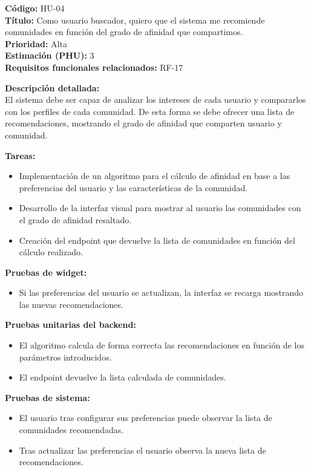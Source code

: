 \begin{tarjetaHU}
\textbf{Código:} HU-04 \\
\textbf{Título:} Como usuario buscador, quiero que el sistema me recomiende comunidades en función del grado de afinidad que compartimos. \\
\textbf{Prioridad:} Alta \\
\textbf{Estimación (PHU):} 3 \\
\textbf{Requisitos funcionales relacionados:} RF-17

\vspace{0.5em}
\textbf{Descripción detallada:} \\
El sistema debe ser capaz de analizar los intereses de cada usuario y compararlos con los perfiles de cada comunidad. De esta forma se debe ofrecer una lista de recomendaciones, mostrando el grado de afinidad que comparten usuario y comunidad.

\vspace{0.5em}
\textbf{Tareas:}
\begin{itemize}[left=0pt]
  \item Implementación de un algoritmo para el cálculo de afinidad en base a las preferencias del usuario y las características de la comunidad.
  \item Desarrollo de la interfaz visual para mostrar al usuario las comunidades con el grado de afinidad resaltado.
  \item Creación del endpoint que devuelve la lista de comunidades en función del cálculo realizado.
\end{itemize}

\vspace{0.5em}
\textbf{Pruebas de widget:}
\begin{itemize}[left=0pt]
  \item Si las preferencias del usuario se actualizan, la interfaz se recarga mostrando las nuevas recomendaciones.
\end{itemize}
\textbf{Pruebas unitarias del backend:}
\begin{itemize}[left=0pt]
  \item El algoritmo calcula de forma correcta las recomendaciones en función de los parámetros introducidos.
  \item El endpoint devuelve la lista calculada de comunidades.
\end{itemize}
\textbf{Pruebas de sistema:}
\begin{itemize}[left=0pt]
  \item El usuario tras configurar sus preferencias puede observar la lista de comunidades recomendadas.
  \item Tras actualizar las preferencias el usuario observa la nueva lista de recomendaciones.
\end{itemize}

\end{tarjetaHU}


